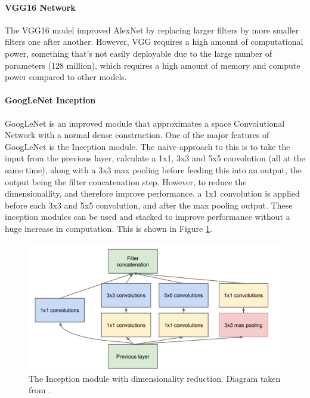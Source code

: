 \documentclass[10pt,a4paper]{article}
\begin{document}
        \paragraph{VGG16 Network}
        The VGG16 model improved AlexNet by replacing larger filters by more smaller filters one after another.
        However, VGG requires a high amount of computational power, something that's not easily deployable due to
        the large number of parameters (128 million), which requires a high amount of memory and compute power compared
        to other models. \cite{DeepNeuralNetworkDeployability}

        \paragraph{GoogLeNet Inception}
        GoogLeNet is an improved module that approximates a space Convolutional Network with a normal
        dense construction. One of the major features of GoogLeNet is the Inception module. The naive approach to this 
        is to take the input from the previous layer, calculate a 1x1, 3x3 and 5x5 convolution (all at the same time), along with
        a 3x3 max pooling before feeding this into an output, the output being the filter concatenation step.
        However, to reduce the dimensionallity, and therefore improve performance, a 1x1 convolution is applied before
        each 3x3 and 5x5 convolution, and after the max pooling output. These inception modules can be used and stacked
        to improve performance without a huge increase in computation. \cite{GoogLeNet} 
        This is shown in Figure \ref{InceptionArchitecture}.

        \begin{figure}
            \centering
            \includegraphics[width=0.7\linewidth]{InceptionModule.png}
            \caption{The Inception module with dimensionality reduction. Diagram taken from \cite{GoogLeNet}.}
            \label{InceptionArchitecture}
        \end{figure}
\end{document}
